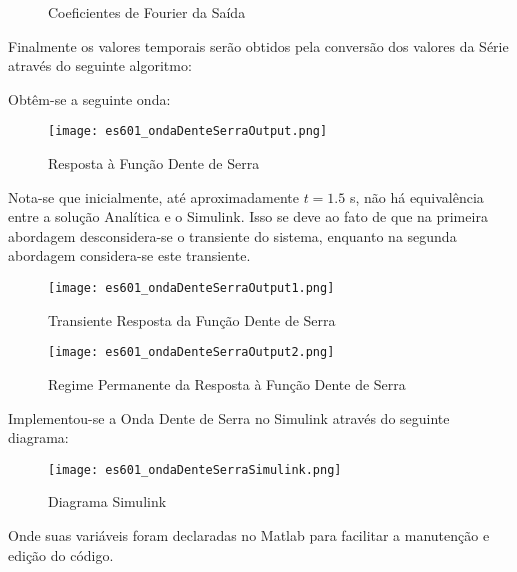 \documentclass{article}
\begin{document}
\begin{resolution}
\begin{figure}[H]
            \caption{Coeficientes de Fourier da Saída}
        \end{figure}
\newpage
        Finalmente os valores temporais serão obtidos pela conversão dos valores da Série através do seguinte algoritmo:
        \begin{scriptsize}
            \myOctave
        \end{scriptsize} 
        Obtêm-se a seguinte onda:
        \begin{figure}[H]
            \centering
            \texttt{[image: es601\_ondaDenteSerraOutput.png]}
            \caption{Resposta à Função Dente de Serra}
        \end{figure}
        Nota-se que inicialmente, até aproximadamente $t = 1.5$ s, não há equivalência entre a solução Analítica e o Simulink. Isso se deve ao fato de que na primeira abordagem desconsidera-se o transiente do sistema, enquanto na segunda abordagem considera-se este transiente.
\newpage
    \begin{figure}[H]
        \centering
        \texttt{[image: es601\_ondaDenteSerraOutput1.png]}
        \caption{Transiente Resposta da Função Dente de Serra}
    \end{figure}
    \begin{figure}[H]
        \centering
        \texttt{[image: es601\_ondaDenteSerraOutput2.png]}
        \caption{Regime Permanente da Resposta à Função Dente de Serra}
    \end{figure}
\newpage
        Implementou-se a Onda Dente de Serra no Simulink através do seguinte diagrama:
        \begin{figure}[H]
            \centering
            \texttt{[image: es601\_ondaDenteSerraSimulink.png]}
            \caption{Diagrama Simulink}
        \end{figure}
        Onde suas variáveis foram declaradas no Matlab para facilitar a manutenção e edição do código.
    \end{resolution}
\end{document}
